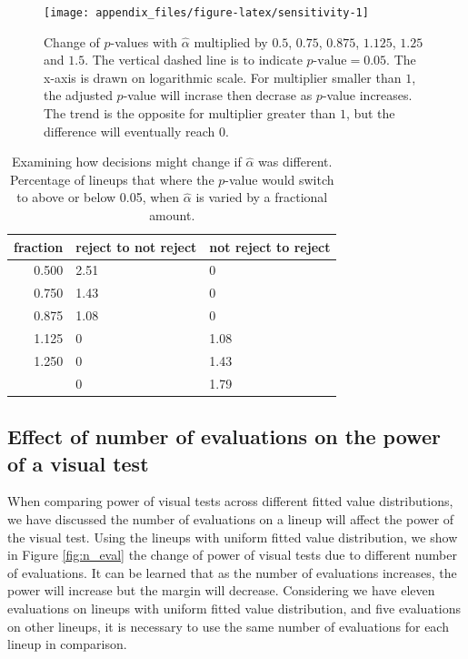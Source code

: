 \documentclass[]{interact}
\theoremstyle{plain}%
\theoremstyle{definition}
\theoremstyle{remark}
\begin{document}
\begin{figure}

{\centering \texttt{[image: appendix\_files/figure-latex/sensitivity-1]} 

}

\caption{Change of $p$-values with $\hat{\alpha}$ multiplied by $0.5$, $0.75$, $0.875$, $1.125$, $1.25$ and $1.5$. The vertical dashed line is to indicate $p\text{-value} = 0.05$. The x-axis is drawn on logarithmic scale. For multiplier smaller than $1$, the adjusted $p$-value will incrase then decrase as $p$-value increases. The trend is the opposite for multiplier greater than $1$, but the difference will eventually reach $0$.}\label{fig:sensitivity}
\end{figure}

\begin{table}

\caption{\label{tab:sensitivity}Examining how decisions might change if $\hat{\alpha}$ was different. Percentage of lineups that where the $p$-value would switch to above or below 0.05, when $\hat{\alpha}$ is varied by a fractional amount.}
\centering
\begin{tabular}[t]{rll}
\toprule
fraction & reject to not reject & not reject to reject\\
\midrule
0.500 & 2.51 & 0\\
0.750 & 1.43 & 0\\
0.875 & 1.08 & 0\\
1.125 & 0 & 1.08\\
1.250 & 0 & 1.43\\
\addlinespace
1.500 & 0 & 1.79\\
\bottomrule
\end{tabular}
\end{table}

\hypertarget{effect-of-number-of-evaluations-on-the-power-of-a-visual-test}{%
\subsection{Effect of number of evaluations on the power of a visual
test}\label{effect-of-number-of-evaluations-on-the-power-of-a-visual-test}}

When comparing power of visual tests across different fitted value
distributions, we have discussed the number of evaluations on a lineup
will affect the power of the visual test. Using the lineups with uniform
fitted value distribution, we show in Figure \ref{fig:n_eval} the change
of power of visual tests due to different number of evaluations. It can
be learned that as the number of evaluations increases, the power will
increase but the margin will decrease. Considering we have eleven
evaluations on lineups with uniform fitted value distribution, and five
evaluations on other lineups, it is necessary to use the same number of
evaluations for each lineup in comparison.
\end{document}
